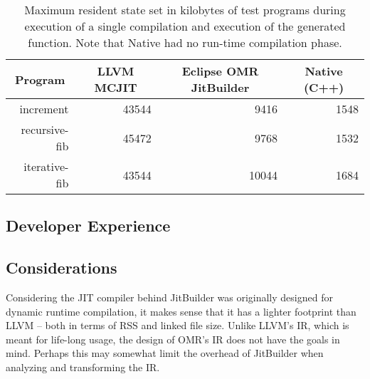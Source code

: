 \begin{table*}[t]
  \begin{tabular}{|r|l|l|l|} 
  \hline
  \multicolumn{1}{|c|}{\textbf{Program}}
  & \multicolumn{1}{c|}{\textbf{LLVM MCJIT}}                      & \multicolumn{1}{c|}{\textbf{Eclipse OMR JitBuilder}}
  & \multicolumn{1}{c|}{\textbf{Native (C++)}}                    \\ \hline

  increment                               
  & \multicolumn{1}{r|}{\num{43544}} %
  & \multicolumn{1}{r|}{\num{9416}} %
  & \multicolumn{1}{r|}{\num{1548}}    %
  \\ \hline
  
  recursive-fib                           
  & \multicolumn{1}{r|}{\num{45472}} %
  & \multicolumn{1}{r|}{\num{9768}} %
  & \multicolumn{1}{r|}{\num{1532}}   %
  \\ \hline
  
  iterative-fib                           
  & \multicolumn{1}{r|}{\num{43544}} %
  & \multicolumn{1}{r|}{\num{10044}} %
  & \multicolumn{1}{r|}{\num{1684}}   %
  \\ \hline
  
\end{tabular}
  \caption{Maximum resident state set in kilobytes of test programs during execution of a single compilation and execution of the generated function. Note that Native had no run-time compilation phase.}
  \label{tab:size_in_bytes}
\end{table*}

\subsection{Developer Experience}

\subsection{Considerations}
Considering the JIT compiler behind JitBuilder was originally designed for dynamic runtime compilation, it makes sense that it has a lighter footprint than LLVM -- both in terms of RSS and linked file size.
Unlike LLVM's IR, which is meant for life-long usage, the design of OMR's IR does not have the goals in mind.
Perhaps this may somewhat limit the overhead of JitBuilder when analyzing and transforming the IR.
